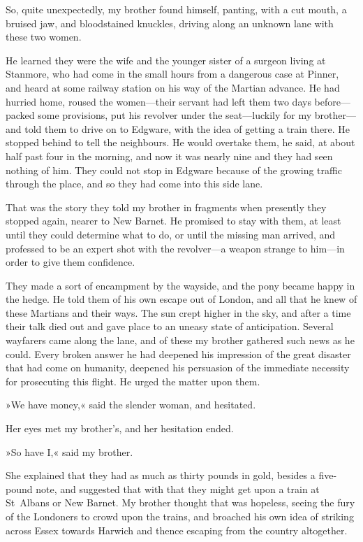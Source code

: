 So, quite unexpectedly, my brother found himself, panting, with a cut mouth, a bruised jaw, and bloodstained knuckles, driving along an unknown lane with these two women.

He learned they were the wife and the younger sister of a surgeon living at Stanmore, \label{broexp2b} who had come in the small hours from a dangerous case at Pinner, and heard at some railway station on his way of the Martian advance. He had hurried home, roused the women—their servant had left them two days before—packed some provisions, put his revolver under the seat—luckily for my brother—and told them to drive on to Edgware, with the idea of getting a train there. He stopped behind to tell the neighbours. He would overtake them, he said, at about half past four in the morning, and now it was nearly nine and they had seen nothing of him. They could not stop in Edgware because of the growing traffic through the place, and so they had come into this side lane.

That was the story they told my brother in fragments when presently they stopped again, nearer to New Barnet. He promised to stay with them, at least until they could determine what to do, or until the missing man arrived, and professed to be an expert shot with the revolver—a weapon strange to him—in order to give them confidence.

They made a sort of encampment by the wayside, and the pony became happy in the hedge. He told them of his own escape out of London, and all that he knew of these Martians and their ways. The sun crept higher in the sky, and after a time their talk died out and gave place to an uneasy state of anticipation. Several wayfarers came along the lane, and of these my brother gathered such news as he could. Every broken answer he had deepened his impression of the great disaster that had come on humanity, deepened his persuasion of the immediate necessity for prosecuting this flight. He urged the matter upon them.

»We have money,« said the slender woman, and hesitated.

Her eyes met my brother's, and her hesitation ended.

»So have I,« said my brother.

She explained that they had as much as thirty pounds in gold, besides a five-pound note, and suggested that with that they might get upon a train at St~Albans or New Barnet. My brother thought that was hopeless, seeing the fury of the Londoners to crowd upon the trains, and broached his own idea of striking across Essex towards Harwich and thence escaping from the country altogether.


